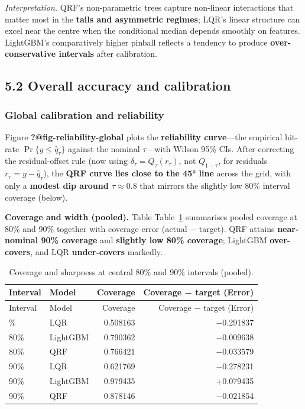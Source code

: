 \documentclass[
  a4paper,
  DIV=11,
  numbers=noendperiod]{scrreprt}
\begin{document}
\emph{Interpretation.} QRF's non-parametric trees capture non-linear
interactions that matter most in the \textbf{tails and asymmetric
regimes}; LQR's linear structure can excel near the centre when the
conditional median depends smoothly on features. LightGBM's
comparatively higher pinball reflects a tendency to produce
\textbf{over-conservative intervals} after calibration.

\subsection{5.2 Overall accuracy and
calibration}\label{overall-accuracy-and-calibration-1}

\subsubsection{Global calibration and
reliability}\label{global-calibration-and-reliability}

Figure \textbf{?@fig-reliability-global} plots the \textbf{reliability
curve}---the empirical hit-rate \(\Pr\{y\le \hat q_\tau\}\) against the
nominal \(\tau\)---with Wilson 95\% CIs. After correcting the
residual-offset rule (now using \(\delta_\tau = Q_\tau(r_\tau)\), not
\(Q_{1-\tau}\), for residuals \(r_\tau = y - \hat q_\tau\)), the
\textbf{QRF curve lies close to the 45° line} across the grid, with only
a \textbf{modest dip around \(\tau\approx0.8\)} that mirrors the
slightly low 80\% interval coverage (below).

\textbf{Coverage and width (pooled).} Table Table~\ref{tbl-cov-width}
summarises pooled coverage at 80\% and 90\% together with coverage error
(actual − target). QRF attains \textbf{near-nominal 90\% coverage} and
\textbf{slightly low 80\% coverage}; LightGBM \textbf{over-covers}, and
LQR \textbf{under-covers} markedly.

\begin{longtable}[]{@{}llrr@{}}
\caption{Coverage and sharpness at central 80\% and 90\% intervals
(pooled).}\label{tbl-cov-width}\tabularnewline
\toprule\noalign{}
Interval & Model & Coverage & Coverage − target (Error) \\
\midrule\noalign{}
\endfirsthead
\toprule\noalign{}
Interval & Model & Coverage & Coverage − target (Error) \\
\midrule\noalign{}
\endhead
\bottomrule\noalign{}
\endlastfoot
80\% & LQR & 0.508163 & −0.291837 \\
80\% & LightGBM & 0.790362 & −0.009638 \\
80\% & QRF & 0.766421 & −0.033579 \\
90\% & LQR & 0.621769 & −0.278231 \\
90\% & LightGBM & 0.979435 & +0.079435 \\
90\% & QRF & 0.878146 & −0.021854 \\
\end{longtable}
\end{document}
